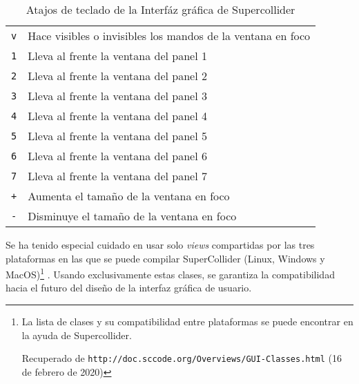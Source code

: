 \begin{table}
	\begin{center}
		\begin{tabular}{ |l|l| }
  		\hline
  		\texttt{v} & Hace visibles o invisibles los mandos de la ventana en foco\\
  		\texttt{1} & Lleva al frente la ventana del panel 1\\
  		\texttt{2} & Lleva al frente la ventana del panel 2\\
  		\texttt{3} & Lleva al frente la ventana del panel 3\\
  		\texttt{4} & Lleva al frente la ventana del panel 4\\
  		\texttt{5} & Lleva al frente la ventana del panel 5\\
  		\texttt{6} & Lleva al frente la ventana del panel 6\\
  		\texttt{7} & Lleva al frente la ventana del panel 7\\
  		\texttt{+} & Aumenta el tamaño de la ventana en foco\\
  		\texttt{-} & Disminuye el tamaño de la ventana en foco\\
  		\hline
		\end{tabular}
		\caption[Atajos de teclado]{Atajos de teclado de la Interfáz gráfica de Supercollider}
		\label{table:atajos}
	\end{center}
\end{table}

	
	Se ha tenido especial cuidado en usar solo \textit{views} compartidas por las tres plataformas en las que se puede compilar SuperCollider (Linux, Windows y MacOS)\footnote{La lista de clases y su compatibilidad entre plataformas se puede encontrar en la ayuda de Supercollider. 
	
	Recuperado de \texttt{http://doc.sccode.org/Overviews/GUI-Classes.html} (16 de febrero de 2020) } . Usando exclusivamente estas clases, se garantiza la compatibilidad hacia el futuro del diseño de la interfaz gráfica de usuario.
